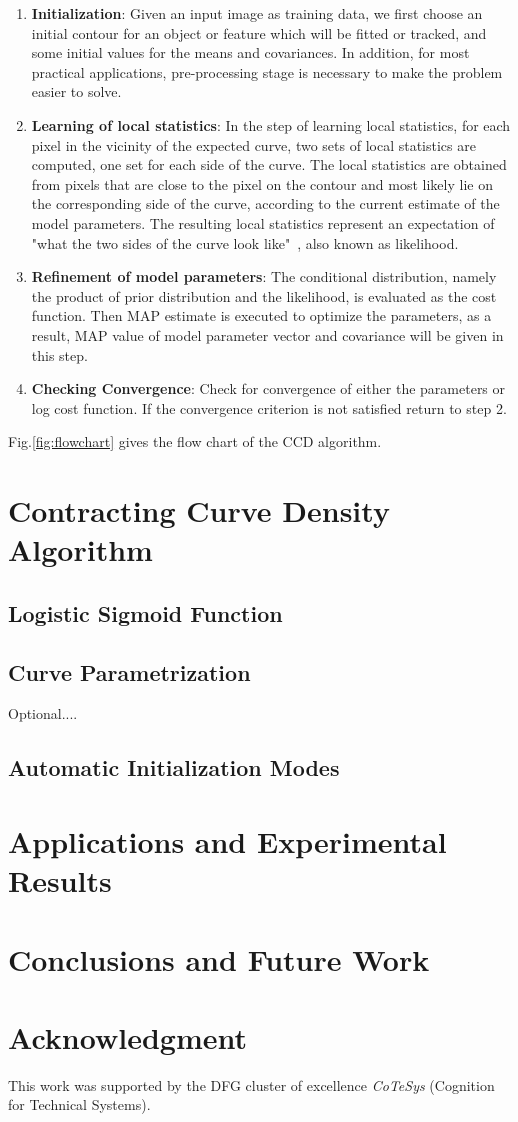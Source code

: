 \documentclass[conference]{IEEEtran}
\begin{document}
\begin{enumerate}
\item \textbf{Initialization}: Given an input image as training data, we first choose an initial
  contour for an object or feature which will be fitted or tracked, and
  some initial values for the means and covariances. In addition, for most practical
  applications, 
  pre-processing stage is necessary to make the problem easier to solve. 
\item \textbf{Learning of local statistics}: In the step of learning local
  statistics, for each pixel in the
  vicinity of the expected curve, two sets of local statistics
  are computed, one set for each side of the curve. The local statistics are obtained from
  pixels that are close to the pixel on the contour and most likely lie
  on the corresponding side of the curve, according to the current
  estimate of the model parameters. The resulting local statistics
  represent an expectation of "what the two sides of the curve look
  like"~\cite{hanek2004contracting}, also known as likelihood.
\item \textbf{Refinement of model parameters}: The conditional distribution, namely
  the product of prior distribution and  the likelihood, is evaluated
  as the cost function. Then MAP estimate is executed to optimize the
  parameters, as a result, MAP value of model parameter vector and
  covariance will be given in this step.
\item \textbf{Checking Convergence}: Check for convergence of either
  the parameters or log cost function. If the convergence criterion is
  not satisfied return to step 2.
\end{enumerate}
Fig.\ref{fig:flowchart} gives the flow chart of the CCD algorithm.

\section{Contracting Curve Density Algorithm}

\subsection{Logistic Sigmoid Function}

\subsection{Curve Parametrization}
Optional....

\subsection{Automatic Initialization Modes}

\section{Applications and Experimental Results}

\section{Conclusions and Future Work}

\section*{Acknowledgment}
 This work was supported by the DFG cluster of excellence \emph{CoTeSys} (Cognition for Technical Systems).


\end{document}
